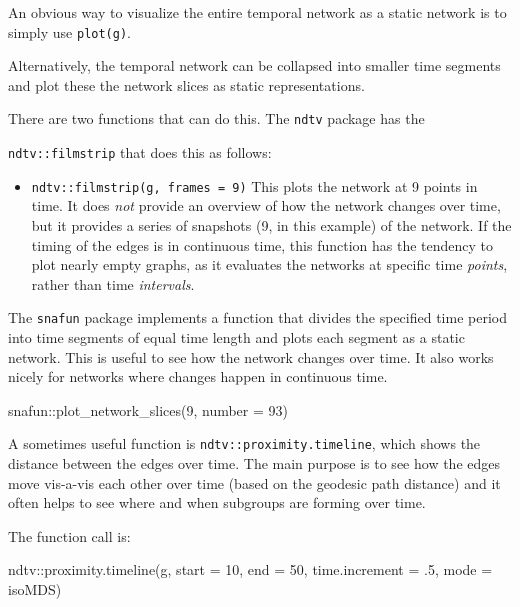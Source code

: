 \documentclass[
]{article}
\newenvironment{Shaded}{\begin{snugshade}}{\end{snugshade}}
\newcommand{\AttributeTok}[1]{\textcolor[rgb]{0.77,0.63,0.00}{#1}}
\newcommand{\DecValTok}[1]{\textcolor[rgb]{0.00,0.00,0.81}{#1}}
\newcommand{\FunctionTok}[1]{\textcolor[rgb]{0.00,0.00,0.00}{#1}}
\newcommand{\NormalTok}[1]{#1}
\newcommand{\SpecialCharTok}[1]{\textcolor[rgb]{0.00,0.00,0.00}{#1}}
\newcommand{\StringTok}[1]{\textcolor[rgb]{0.31,0.60,0.02}{#1}}
\providecommand{\tightlist}{%
  \setlength{\itemsep}{0pt}\setlength{\parskip}{0pt}}
\begin{document}
An obvious way to visualize the entire temporal network as a static
network is to simply use \texttt{plot(g)}.

Alternatively, the temporal network can be collapsed into smaller time
segments and plot these the network slices as static representations.

There are two functions that can do this. The \texttt{ndtv} package has
the

\texttt{ndtv::filmstrip} that does this as follows:

\begin{itemize}
\tightlist
\item
  \texttt{ndtv::filmstrip(g,\ frames\ =\ 9)} This plots the network at 9
  points in time. It does \emph{not} provide an overview of how the
  network changes over time, but it provides a series of snapshots (9,
  in this example) of the network. If the timing of the edges is in
  continuous time, this function has the tendency to plot nearly empty
  graphs, as it evaluates the networks at specific time \emph{points},
  rather than time \emph{intervals}.
\end{itemize}

The \texttt{snafun} package implements a function that divides the
specified time period into time segments of equal time length and plots
each segment as a static network. This is useful to see how the network
changes over time. It also works nicely for networks where changes
happen in continuous time.

\begin{Shaded}
\begin{Highlighting}[]
\NormalTok{snafun}\SpecialCharTok{::}\FunctionTok{plot\_network\_slices}\NormalTok{(}\DecValTok{9}\NormalTok{, }\AttributeTok{number =} \DecValTok{93}\NormalTok{)}
\end{Highlighting}
\end{Shaded}

A sometimes useful function is \texttt{ndtv::proximity.timeline}, which
shows the distance between the edges over time. The main purpose is to
see how the edges move vis-a-vis each other over time (based on the
geodesic path distance) and it often helps to see where and when
subgroups are forming over time.

The function call is:

\begin{Shaded}
\begin{Highlighting}[]
\NormalTok{ndtv}\SpecialCharTok{::}\FunctionTok{proximity.timeline}\NormalTok{(g,  }\AttributeTok{start =} \DecValTok{10}\NormalTok{, }\AttributeTok{end =} \DecValTok{50}\NormalTok{,}
                         \AttributeTok{time.increment =}\NormalTok{ .}\DecValTok{5}\NormalTok{,}
                         \AttributeTok{mode =} \StringTok{\textquotesingle{}isoMDS\textquotesingle{}}\NormalTok{)}
\end{Highlighting}
\end{Shaded}
\end{document}
